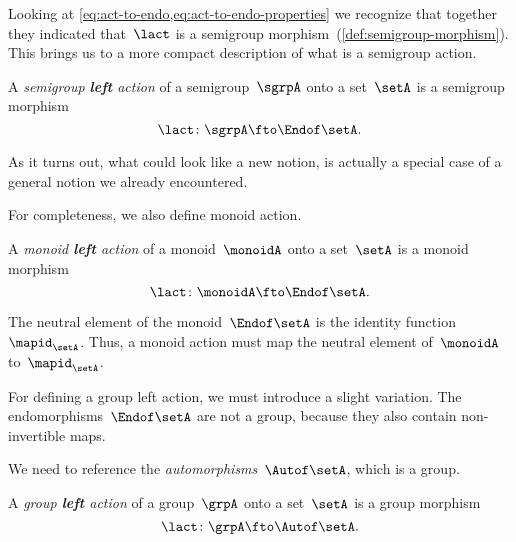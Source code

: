 Looking at \cref{eq:act-to-endo,eq:act-to-endo-properties} we recognize that together
they indicated that~$\lact$ is a semigroup morphism~(\cref{def:semigroup-morphism}). This brings us to a more compact description of what is a semigroup action.

\begin{ctdefinition}\label{def:semigroup-left-action}
  A \emph{semigroup \textbf{left} action} of a semigroup~$\sgrpA$ onto a set~$\setA$ is a semigroup morphism
  \begin{equation}\label{eq:act-semigroup}
    \lact \colon \sgrpA \fto \Endof\setA.
  \end{equation}
\end{ctdefinition}

As it turns out, what could look like a new notion, is actually a special case of a general notion we already encountered.

For completeness, we also define monoid action.

\begin{ctdefinition}\label{def:monoid-left-action}
  A \emph{monoid \textbf{left} action} of a monoid~$\monoidA$ onto a set~$\setA$ is a monoid morphism
  \begin{equation}\label{eq:act-monoid}
    \lact \colon \monoidA \fto \Endof\setA.
  \end{equation}
\end{ctdefinition}

The neutral element of the monoid~$\Endof\setA$ is the identity function~$\mapid_{\setA}$.
Thus, a monoid action must map the neutral element of~$\monoidA$ to~$\mapid_{\setA}$.
%


For defining a group left action, we must introduce a slight variation.
The endomorphisms~$\Endof\setA$ are not a group, because they also contain non-invertible maps.

We need to reference the \emph{automorphisms}~$\Autof\setA$, which is a group.

\begin{ctdefinition}\label{def:group-left-action}
  A \emph{group \textbf{left} action} of a group~$\grpA$ onto a set~$\setA$ is a group morphism
  \begin{equation}\label{eq:act-group}
    \lact \colon \grpA \fto \Autof\setA.
  \end{equation}
\end{ctdefinition}


